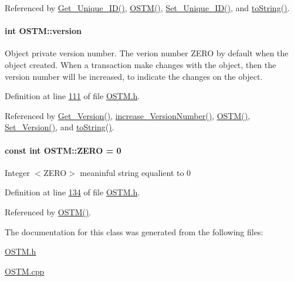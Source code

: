 Referenced by \hyperlink{_o_s_t_m_8cpp_source_l00082}{Get\+\_\+\+Unique\+\_\+\+I\+D()}, \hyperlink{_o_s_t_m_8cpp_source_l00021}{O\+S\+T\+M()}, \hyperlink{_o_s_t_m_8cpp_source_l00075}{Set\+\_\+\+Unique\+\_\+\+I\+D()}, and \hyperlink{_o_s_t_m_8h_source_l00051}{to\+String()}.

\paragraph[{\texorpdfstring{version}{version}}]{\setlength{\rightskip}{0pt plus 5cm}int O\+S\+T\+M\+::version\hspace{0.3cm}{\ttfamily [private]}}\hypertarget{class_o_s_t_m_a9a6ea36181be2db7f9082d77956511d7_a9a6ea36181be2db7f9082d77956511d7}{}\label{class_o_s_t_m_a9a6ea36181be2db7f9082d77956511d7_a9a6ea36181be2db7f9082d77956511d7}
Object private version number. The verion number Z\+E\+RO by default when the object created. When a transaction make changes with the object, then the version number will be increased, to indicate the changes on the object. 

Definition at line \hyperlink{_o_s_t_m_8h_source_l00111}{111} of file \hyperlink{_o_s_t_m_8h_source}{O\+S\+T\+M.\+h}.



Referenced by \hyperlink{_o_s_t_m_8cpp_source_l00100}{Get\+\_\+\+Version()}, \hyperlink{_o_s_t_m_8cpp_source_l00108}{increase\+\_\+\+Version\+Number()}, \hyperlink{_o_s_t_m_8cpp_source_l00021}{O\+S\+T\+M()}, \hyperlink{_o_s_t_m_8cpp_source_l00092}{Set\+\_\+\+Version()}, and \hyperlink{_o_s_t_m_8h_source_l00051}{to\+String()}.

\paragraph[{\texorpdfstring{Z\+E\+RO}{ZERO}}]{\setlength{\rightskip}{0pt plus 5cm}const int O\+S\+T\+M\+::\+Z\+E\+RO = 0\hspace{0.3cm}{\ttfamily [private]}}\hypertarget{class_o_s_t_m_a0bb6ae8411d25f8e7b82d0a61729ea89_a0bb6ae8411d25f8e7b82d0a61729ea89}{}\label{class_o_s_t_m_a0bb6ae8411d25f8e7b82d0a61729ea89_a0bb6ae8411d25f8e7b82d0a61729ea89}
Integer $<$\+Z\+E\+R\+O$>$ meaninful string equalient to 0 

Definition at line \hyperlink{_o_s_t_m_8h_source_l00134}{134} of file \hyperlink{_o_s_t_m_8h_source}{O\+S\+T\+M.\+h}.



Referenced by \hyperlink{_o_s_t_m_8cpp_source_l00021}{O\+S\+T\+M()}.



The documentation for this class was generated from the following files\+:\begin{DoxyCompactItemize}
\item 
\hyperlink{_o_s_t_m_8h}{O\+S\+T\+M.\+h}\item 
\hyperlink{_o_s_t_m_8cpp}{O\+S\+T\+M.\+cpp}\end{DoxyCompactItemize}
